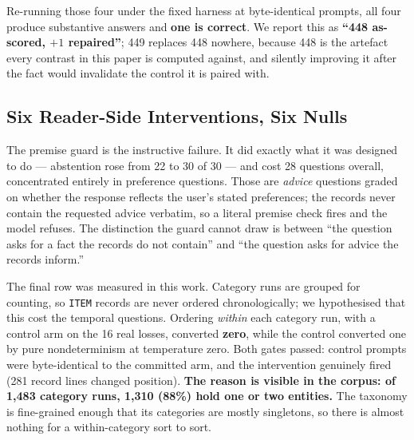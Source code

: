 Re-running those four under the fixed harness at byte-identical prompts, all four produce substantive answers and \textbf{one is correct}. We report this as \textbf{``448 as-scored, $+1$ repaired''}; 449 replaces 448 nowhere, because 448 is the artefact every contrast in this paper is computed against, and silently improving it after the fact would invalidate the control it is paired with.

\subsection{Six Reader-Side Interventions, Six Nulls}

\begin{table}[!htbp]
\centering
\caption{Every attempt to fix aggregation by changing what the reader is shown or told.}
\label{tab:nulls}
\end{table}

The premise guard is the instructive failure. It did exactly what it was designed to do --- abstention rose from 22 to 30 of 30 --- and cost 28 questions overall, concentrated entirely in preference questions. Those are \emph{advice} questions graded on whether the response reflects the user's stated preferences; the records never contain the requested advice verbatim, so a literal premise check fires and the model refuses. The distinction the guard cannot draw is between ``the question asks for a fact the records do not contain'' and ``the question asks for advice the records inform.''

The final row was measured in this work. Category runs are grouped for counting, so \texttt{ITEM} records are never ordered chronologically; we hypothesised that this cost the temporal questions. Ordering \emph{within} each category run, with a control arm on the 16 real losses, converted \textbf{zero}, while the control converted one by pure nondeterminism at temperature zero. Both gates passed: control prompts were byte-identical to the committed arm, and the intervention genuinely fired (281 record lines changed position). \textbf{The reason is visible in the corpus: of 1{,}483 category runs, 1{,}310 (88\%) hold one or two entities.} The taxonomy is fine-grained enough that its categories are mostly singletons, so there is almost nothing for a within-category sort to sort.


